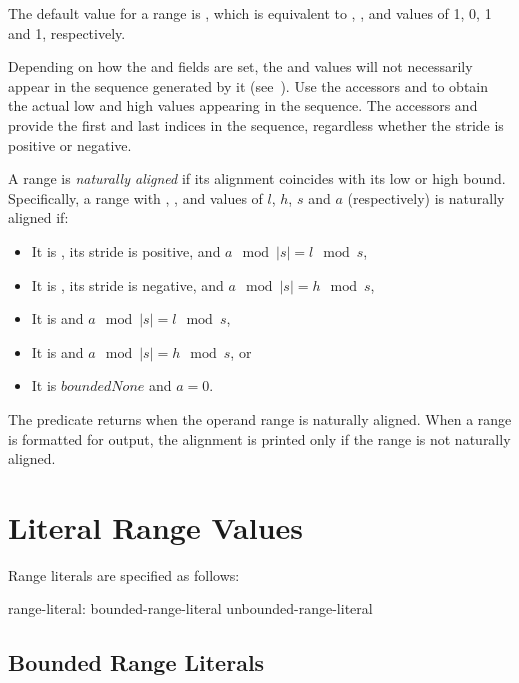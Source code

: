 The default value for a range is , which is equivalent to , , 
and  values of 1, 0, 1 and 1, respectively.

Depending on how the  and  fields are set,
the  and  values will not necessarily appear in the
sequence generated by it (see~).  Use the
accessors  and  to obtain the actual low and
high values appearing in the sequence.  The accessors  and  provide
the first and last indices in the sequence, regardless whether the stride is
positive or negative.  

A range is \emph{naturally aligned} if its alignment coincides with its low or
high bound.  Specifically, a range with , , 
and  values of $l$, $h$, $s$ and $a$ (respectively) is naturally aligned if:
\begin{itemize}
\item It is , its stride is positive, and $a\!\mod |s| = l\!\mod s$,
\item It is , its stride is negative, and $a\!\mod |s| = h\!\mod s$,
\item It is  and $a\!\mod |s| = l\!\mod s$,
\item It is  and $a\!\mod |s| = h\!\mod s$, or
\item It is $boundedNone$ and $a = 0$.
\end{itemize}
\noindent The  predicate returns  when the operand
range is naturally aligned.  When a range is formatted for output, the alignment
is printed only if the range is not naturally aligned.

\section{Literal Range Values}
\label{Range_Literals}

Range literals are specified as follows:
\begin{syntax}
range-literal:
  bounded-range-literal
  unbounded-range-literal
\end{syntax}

\subsection{Bounded Range Literals}
\label{Bounded_Ranges}

